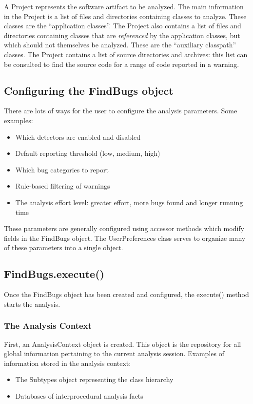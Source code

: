 \documentclass[11pt]{article}
\begin{document}
A Project represents the software artifact to be analyzed.
The main information in the Project is a list of files and directories
containing classes to analyze.  These classes are the ``application classes''.
The Project also contains a list of
files and directories containing classes that are {\em referenced}
by the application classes, but which should not themselves be analyzed.
These are the ``auxiliary classpath'' classes.  The Project contains
a list of source directories and archives: this list can be consulted to
find the source code for a range of code reported in a warning.

\subsection{Configuring the FindBugs object}

There are lots of ways for the user to configure the analysis parameters.
Some examples:
\begin{itemize}
\item Which detectors are enabled and disabled
\item Default reporting threshold (low, medium, high)
\item Which bug categories to report
\item Rule-based filtering of warnings
\item The analysis effort level: greater effort, more bugs found and longer running time
\end{itemize}

These parameters are generally configured using accessor methods which
modify fields in the FindBugs object.  The UserPreferences class serves
to organize many of these parameters into a single object.

\subsection{FindBugs.execute()}

Once the FindBugs object has been created and configured, the execute() method
starts the analysis.

\subsubsection{The Analysis Context}

First, an AnalysisContext object is created.  This object is the repository for
all global information pertaining to the current analysis session.
Examples of information stored in the analysis context:
\begin{itemize}
\item The Subtypes object representing the class hierarchy
\item Databases of interprocedural analysis facts
\end{itemize}
\end{document}
